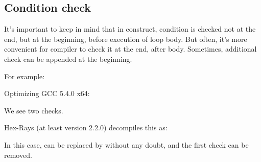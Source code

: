 \subsection{Condition check}

It's important to keep in mind that in  construct, condition is checked not at the end, but at the beginning, before execution of loop body.
But often, it's more convenient for compiler to check it at the end, after body.
Sometimes, additional check can be appended at the beginning.

For example:



Optimizing GCC 5.4.0 x64:



We see two checks.

Hex-Rays (at least version 2.2.0) decompiles this as:



In this case,  can be replaced by  without any doubt, and the first check can be removed.

